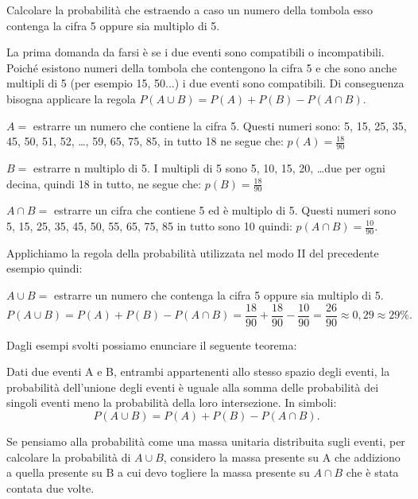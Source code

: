 \begin{esempio}
Calcolare la probabilità che estraendo a caso un numero della tombola esso 
contenga la cifra 5 oppure sia multiplo di 5.

La prima domanda da farsi è se i due eventi sono compatibili o incompatibili. 
Poiché esistono numeri della tombola che contengono la cifra 5 e che sono 
anche 
multipli di 5 (per esempio 15, 50...) i due eventi sono compatibili. Di 
conseguenza bisogna applicare la regola \(P(A\cup B)=P(A)+P(B)-P(A\cap B)\).
\begin{itemize*}
\item \( A = \) estrarre un numero che contiene la cifra 5. Questi numeri sono: 
5, 
15, 25, 35, 45, 50, 51, 52, \dots, 59, 65, 75, 85, in tutto 18 ne segue che: 
\(p(A)=\frac{18}{90}\)
\item \( B = \) estrarre n multiplo di 5. I multipli di 5 sono 5, 10, 15, 20, 
\dots due per ogni decina, quindi 18 in tutto, ne segue che: 
\(p(B)=\frac{18}{90}\)
\item \(A\cap B =\) estrarre un cifra che contiene 5 ed è multiplo di 5. Questi 
numeri sono 5, 15, 25, 35, 45, 50, 55, 65, 75, 85 in tutto sono 10 quindi: 
\(p(A\cap B)=\frac{10}{90}\).
\end{itemize*}
Applichiamo la regola della probabilità utilizzata nel modo II del precedente 
esempio quindi:

\(A\cup B =\) estrarre un numero che contenga la cifra 5 oppure sia multiplo di 
5. 
\[ P(A\cup B)=P(A)+P(B)-P(A\cap 
B)=\frac{18}{90}+\frac{18}{90}-\frac{10}{90}=\frac{26}{90}\approx 0,29\approx 
29\%. \]
\end{esempio}

Dagli esempi svolti possiamo enunciare il seguente teorema:

\begin{teorema}
Dati due eventi A e B, entrambi appartenenti allo stesso spazio degli eventi, 
la 
probabilità dell'unione degli eventi è uguale alla somma delle probabilità 
dei 
singoli eventi meno la probabilità della loro intersezione.
In simboli: \[ P(A\cup B)=P(A)+P(B)-P(A\cap B). \]
\end{teorema}
Se pensiamo alla probabilità come una massa unitaria distribuita sugli 
eventi, 
per calcolare la probabilità di \(A\cup B\), considero la massa presente su A 
che 
addiziono a quella presente su B a cui devo togliere la massa presente su 
\(A\cap 
B\) che è stata contata due volte.

